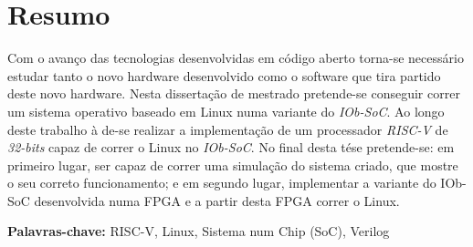 
\section*{Resumo}


\quad Com o avanço das tecnologias desenvolvidas em código aberto torna-se necessário estudar tanto o novo hardware desenvolvido como o software que tira partido deste novo hardware. Nesta dissertação de mestrado pretende-se conseguir correr um sistema operativo baseado em Linux numa variante do \textit{IOb-SoC}. Ao longo deste trabalho à de-se realizar a implementação de um processador \textit{RISC-V} de \textit{32-bits} capaz de correr o Linux no \textit{IOb-SoC}. No final desta tése pretende-se: em primeiro lugar, ser capaz de correr uma simulação do sistema criado, que mostre o seu correto funcionamento; e em segundo lugar, implementar a variante do IOb-SoC desenvolvida numa FPGA e a partir desta FPGA correr o Linux.

\vfill

\textbf{\Large Palavras-chave:} RISC-V, Linux, Sistema num Chip (SoC), Verilog
